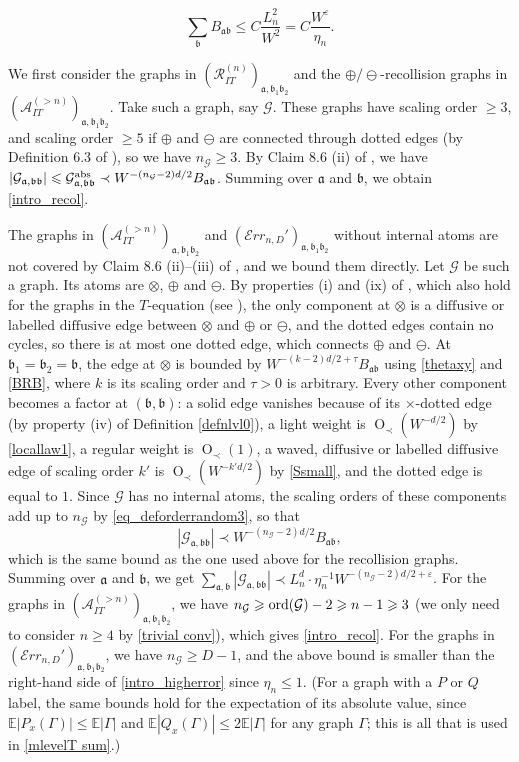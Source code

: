 \documentclass{article}
\newcommand{\1}{\mathds{1}}
\numberwithin{equation}{section}
\newcommand{\ord}{{\rm{ord}}}
\newcommand{\e}{{\varepsilon}}
\newcommand{\fa}{{\mathfrak a}}
\newcommand{\fb}{{\mathfrak b}}
\renewcommand{\cal}{\mathcal}
\renewcommand{\leq}{\leqslant}
\renewcommand{\geq}{\geqslant}
\renewcommand{\le}{\leq}
\renewcommand{\ge}{\geq}
\newcommand{\E}{\mathbb{E}}
\newcommand{\dashed}{\text{diffusive}}
\DeclareMathOperator{\OO}{O}
\theoremstyle{plain} %
\theoremstyle{remark}
\newcommand{\incomp}{{\text{$T$-equation}}}
\newcommand{\PITn}{{\mathcal R_{IT}^{(n)}}}
\newcommand{\AITn}{{\mathcal A_{IT}^{(>n)}}}
\newcommand{\Err}{{\mathcal Err}}
\begin{document}
$$\sum_{\fb}B_{\fa\fb}\le C\frac{L_n^2}{W^2}=C\frac{W^{\e}}{\eta_n}.$$

We first consider the graphs in $(\PITn)_{\fa,\fb_1\fb_2}$ and the $\oplus/\ominus$-recollision graphs in $(\AITn)_{\fa,\fb_1\fb_2}$. Take such a graph, say $\cal G$. These graphs have scaling order $\ge 3$, and scaling order $\ge 5$ if $\oplus$ and $\ominus$ are connected through dotted edges (by Definition 6.3 of \cite{PartII_high}), so we have $n_{\cal G}\ge 3$. By Claim 8.6 (ii) of \cite{PartII_high}, we have $|\cal G_{\fa,\fb\fb}|\le \cal G^{\rm abs}_{\fa,\fb\fb}\prec W^{-(n_{\cal G}-2)d/2}B_{\fa\fb}$. Summing over $\fa$ and $\fb$, we obtain \eqref{intro_recol}. 

The graphs in $(\AITn)_{\fa,\fb_1\fb_2}$ and $(\Err_{n,D}')_{\fa,\fb_1\fb_2}$ without internal atoms are not covered by Claim 8.6 (ii)--(iii) of \cite{PartII_high}, and we bound them directly. Let $\cal G$ be such a graph. Its atoms are $\otimes$, $\oplus$ and $\ominus$. By properties (i) and (ix) of \cite[Definition 3.2]{PartII_high}, which also hold for the graphs in the $\incomp$ (see \cite[Definition 3.3]{PartII_high}), the only component at $\otimes$ is a $\dashed$ or labelled $\dashed$ edge between $\otimes$ and $\oplus$ or $\ominus$, and the dotted edges contain no cycles, so there is at most one dotted edge, which connects $\oplus$ and $\ominus$. At $\fb_1=\fb_2=\fb$, the edge at $\otimes$ is bounded by $W^{-(k-2)d/2+\tau}B_{\fa\fb}$ using \eqref{thetaxy} and \eqref{BRB}, where $k$ is its scaling order and $\tau>0$ is arbitrary. Every other component becomes a factor at $(\fb,\fb)$: a solid edge vanishes because of its $\times$-dotted edge (by property (iv) of Definition \ref{defnlvl0}), a light weight is $\OO_\prec(W^{-d/2})$ by \eqref{locallaw1}, a regular weight is $\OO_\prec(1)$, a waved, $\dashed$ or labelled $\dashed$ edge of scaling order $k'$ is $\OO_\prec(W^{-k'd/2})$ by \eqref{Ssmall}, and the dotted edge is equal to $1$. Since $\cal G$ has no internal atoms, the scaling orders of these components add up to $n_{\cal G}$ by \eqref{eq_deforderrandom3}, so that 
$$|\cal G_{\fa,\fb\fb}|\prec W^{-(n_{\cal G}-2)d/2}B_{\fa\fb},$$ 
which is the same bound as the one used above for the recollision graphs. Summing over $\fa$ and $\fb$, we get $\sum_{\fa,\fb}|\cal G_{\fa,\fb\fb}|\prec L_n^d\cdot \eta_n^{-1}W^{-(n_{\cal G}-2)d/2+\e}$. For the graphs in $(\AITn)_{\fa,\fb_1\fb_2}$, we have $n_{\cal G}\ge \ord(\cal G)-2\ge n-1\ge 3$ (we only need to consider $n\ge 4$ by \eqref{trivial conv}), which gives \eqref{intro_recol}. For the graphs in $(\Err_{n,D}')_{\fa,\fb_1\fb_2}$, we have $n_{\cal G}\ge D-1$, and the above bound is smaller than the right-hand side of \eqref{intro_higherror} since $\eta_n\le 1$. (For a graph with a $P$ or $Q$ label, the same bounds hold for the expectation of its absolute value, since $\E|P_x(\Gamma)|\le \E|\Gamma|$ and $\E|Q_x(\Gamma)|\le 2\E|\Gamma|$ for any graph $\Gamma$; this is all that is used in \eqref{mlevelT sum}.) %
\end{document}
